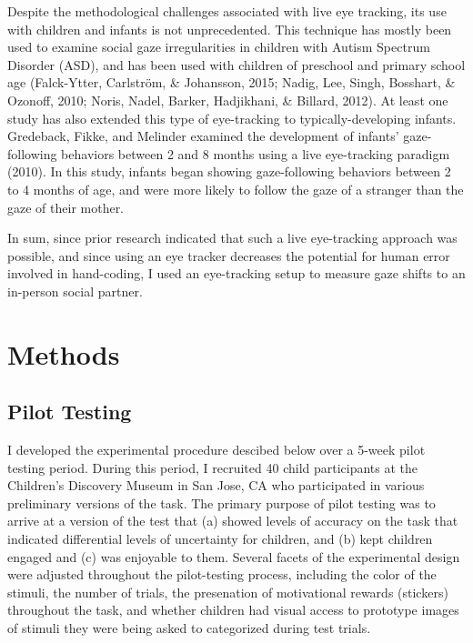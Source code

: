 \documentclass[floatsintext,man]{apa6}
\theoremstyle{definition}
\theoremstyle{definition}
\theoremstyle{definition}
\theoremstyle{remark}
\begin{document}
Despite the methodological challenges associated with live eye tracking,
its use with children and infants is not unprecedented. This technique
has mostly been used to examine social gaze irregularities in children
with Autism Spectrum Disorder (ASD), and has been used with children of
preschool and primary school age (Falck-Ytter, Carlström, \& Johansson,
2015; Nadig, Lee, Singh, Bosshart, \& Ozonoff, 2010; Noris, Nadel,
Barker, Hadjikhani, \& Billard, 2012). At least one study has also
extended this type of eye-tracking to typically-developing infants.
Gredeback, Fikke, and Melinder examined the development of infants'
gaze-following behaviors between 2 and 8 months using a live
eye-tracking paradigm (2010). In this study, infants began showing
gaze-following behaviors between 2 to 4 months of age, and were more
likely to follow the gaze of a stranger than the gaze of their mother.

In sum, since prior research indicated that such a live eye-tracking
approach was possible, and since using an eye tracker decreases the
potential for human error involved in hand-coding, I used an
eye-tracking setup to measure gaze shifts to an in-person social
partner.

\section{Methods}\label{methods}

\subsection{Pilot Testing}\label{pilot-testing}

I developed the experimental procedure descibed below over a 5-week
pilot testing period. During this period, I recruited 40 child
participants at the Children's Discovery Museum in San Jose, CA who
participated in various preliminary versions of the task. The primary
purpose of pilot testing was to arrive at a version of the test that (a)
showed levels of accuracy on the task that indicated differential levels
of uncertainty for children, and (b) kept children engaged and (c) was
enjoyable to them. Several facets of the experimental design were
adjusted throughout the pilot-testing process, including the color of
the stimuli, the number of trials, the presenation of motivational
rewards (stickers) throughout the task, and whether children had visual
access to prototype images of stimuli they were being asked to
categorized during test trials.
\end{document}
